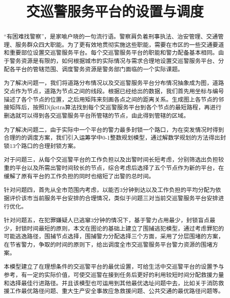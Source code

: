 \documentclass{cumcmthesis}
\title{交巡警服务平台的设置与调度}
\begin{document}
\maketitle

\tableofcontents

\newpage
\begin{abstract}
  “有困难找警察”，是家喻户晓的一句流行语。警察肩负着刑事执法、治安管理、交通管理、服务群众四大职能。为了更有效地贯彻实施这些职能，需要在市区的一些交通要道和重要部位设置交巡警服务平台。每个交巡警服务平台的职能和警力配备基本相同。由于警务资源是有限的，如何根据城市的实际情况与需求合理地设置交巡警服务平台、分配各平台的管辖范围、调度警务资源是警务部门面临的一个实际课题。

  为了解决问题一，我们将道路分布情况以及交巡警服务平台分布情况抽象成为图，道路交点作为节点，道路为节点之间的线段。根据已经给出的数据，我们首先用坐标与编号描述了各个节点的位置，之后用矩阵来刻画各点之间的距离关系。生成图上各节点的邻接矩阵后，按照Dijkstra算法找到每个交巡警服务平台到各个节点的最短路程，再进行删选就可以得到各交巡警服务平台所管辖的节点，由此得到管辖的区域。

  为了解决问题二，由于实际中一个平台的警力最多封锁一个路口，为在突发情况时得到合理的的调度方案，我们引入运筹学中0-1整数规划模型，通过解数学规划的方法得出封锁13个路口的合理封锁方案。

  对于问题三，从每个交巡警平台的工作负担以及出警时间长短考虑，分别筛选出负担较重的平台以及所需出警时间较长的节点，综合考虑后选择了五个节点作为新的平台，在缓解了原有平台的工作负担的同时也缩短了出警的总时间。

  针对问题四，首先从全市范围内考虑，以能否3分钟到达以及工作负担的平均分配为依据评价该市当前服务平台安排的合理情况，类似于问题三对当前交巡警服务平台安排进行优化。

  针对问题五，在犯罪嫌疑人已逃窜3分钟的情况下，基于警力占用最少，封锁盲点最少，封锁时间最短的原则，本文在图论的基础上建立了围捕逃犯模型，通过考虑罪犯的可能逃逸路径，围捕节点选择，围捕警力分配选择三个方面，采用了分层围堵的方案，在节省警力，争取的时间的原则下，给出调度全市交巡警服务平台警力资源的围堵方案。


  本模型建立了在理想条件的交巡警平台的最优设置，可给生活中交巡警平台的设置予与参考，有一定的实际价值，可使交巡警在接到任务后更好的利用较短时间分配救援力量和选择最佳行进路径。并且该模型也可运用到其他最优选址问题中去，比如关于消防救援工作最优路径问题、重大生产安全事故应急救援问题、公共交通的最优路径问题等。


\end{abstract}
\end{document}
